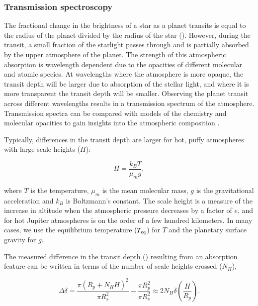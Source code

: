 \subsubsection{Transmission spectroscopy}

The fractional change in the brightness of a star as a planet transits is equal to the radius of the planet divided by the radius of the star (\rprss). However, during the transit, a small fraction of the starlight passes through and is partially absorbed by the upper atmosphere of the planet. The strength of this atmospheric absorption is wavelength dependent due to the opacities of different molecular and atomic species. At wavelengths where the atmosphere is more opaque, the transit depth will be larger due to absorption of the stellar light, and where it is more transparent the transit depth will be smaller. Observing the planet transit across different wavelengths results in a transmission spectrum of the atmosphere. Transmission spectra can be compared with models of the chemistry and molecular opacities to gain insights into the atmospheric composition \citep{Charbonneau2002, Vidal-Madjar2003, Tinetti2007, Swain2008}.

Typically, differences in the transit depth are larger for hot, puffy atmospheres with large scale heights ($H$):

\begin{equation}
    H = \frac{k_B T}{\mu_m g},
\end{equation}

where $T$ is the temperature, $\mu_m$ is the mean molecular mass, $g$ is the gravitational acceleration and $k_B$ is Boltzmann's constant. The scale height is a measure of the increase in altitude when the atmospheric pressure decreases by a factor of $e$, and for hot Jupiter atmospheres is on the order of a few hundred kilometers. In many cases, we use the equilibrium temperature ($T_{\rm eq}$) for $T$ and the planetary surface gravity for $g$.

The measured difference in the transit depth (\rprss) resulting from an absorption feature can be written in terms of the number of scale heights crossed ($N_H$),

\begin{equation}
\Delta \delta = \frac{\pi(R_p + N_H H)^2}{\pi R_s^2} -
\frac{\pi R_p^2}{\pi R_s^2}
 \approx 2 N_H \delta \left(\frac{H}{R_p}\right).
\label{int:eq:NH}
\end{equation}

